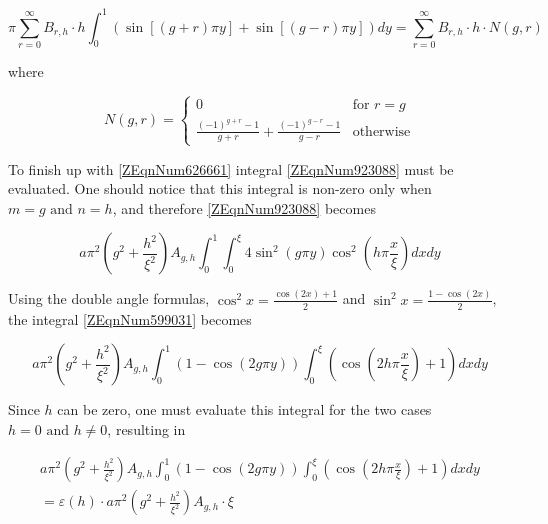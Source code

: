 \documentclass{article}
\newcommand{\spbox}[1]{ \text{ #1 }} %
\begin{document}
\begin{equation*}
    \pi \sum _{r=0}^{\infty }B_{r,h} \cdot h\int _{0}^{1} \left(\sin
\left[\left(g+r\right)\pi y\right]+\sin \left[\left(g-r\right)\pi
y\right]\right) dy =\sum _{r=0}^{\infty }B_{r,h} \cdot h\cdot N\left(g,r\right)
\end{equation*}

where

\begin{equation} \label{3.19)} 
    N\left(g,r\right) = \begin{cases}
    0 & \text{for } r = g \\
    \frac{\left(-1\right)^{g + r} - 1}{g + r} + \frac{\left(-1\right)^{g - r} - 1}{g - r} 
    & \text{otherwise}\end{cases} 
\end{equation}

 To finish up with \eqref{ZEqnNum626661} integral \eqref{ZEqnNum923088} must be
 evaluated. One should notice that this integral is non-zero only when $m = g
 \spbox{and} n = h$, and therefore \eqref{ZEqnNum923088} becomes

\begin{equation} \label{ZEqnNum599031} 
    a \pi ^{2} \left(g^{2} + \frac{h^{2}}{\xi^{2}} \right)
    A_{g,h} \int _{0}^{1} \int _{0}^{\xi} 4 \sin ^{2} 
    \left(g \pi y\right) \cos ^{2} \left(h \pi \frac{x}{\xi} \right)dxdy 
\end{equation}

Using the double angle formulas, $\cos ^{2} x = \frac{\cos \left(2x\right) + 1}{2} $
and $\sin ^{2} x = \frac{1 - \cos \left(2 x \right)}{2} $, the integral
\eqref{ZEqnNum599031} becomes

\begin{equation} \label{3.21)} 
    a\pi ^{2} \left(g^{2} +\frac{h^{2} }{\xi ^{2} } \right)
    A_{g,h} \int _{0}^{1} \left(1-\cos \left(2g\pi y\right)\right)
    \int_{0}^{\xi } \left(\cos \left(2h \pi \frac{x}{\xi } \right) + 1\right) dxdy
\end{equation}

Since $h$ can be zero, one must evaluate this integral for the two cases
$h = 0 \spbox{and} h \ne 0$, resulting in

\begin{equation} \label{3.22)} 
    \begin{array}{l} {a\pi ^{2} \left(g^{2}
    +\frac{h^{2} }{\xi ^{2} } \right)A_{g,h} \int _{0}^{1} \left(1-\cos \left(2g\pi
    y\right)\right)\int _{0}^{\xi } \left(\cos \left(2h\pi \frac{x}{\xi }
    \right)+1\right)dxdy } \\ {=\varepsilon \left(h\right)\cdot a\pi ^{2}
    \left(g^{2} +\frac{h^{2} }{\xi ^{2} } \right)A_{g,h} \cdot \xi } \end{array}
\end{equation}
\end{document}
